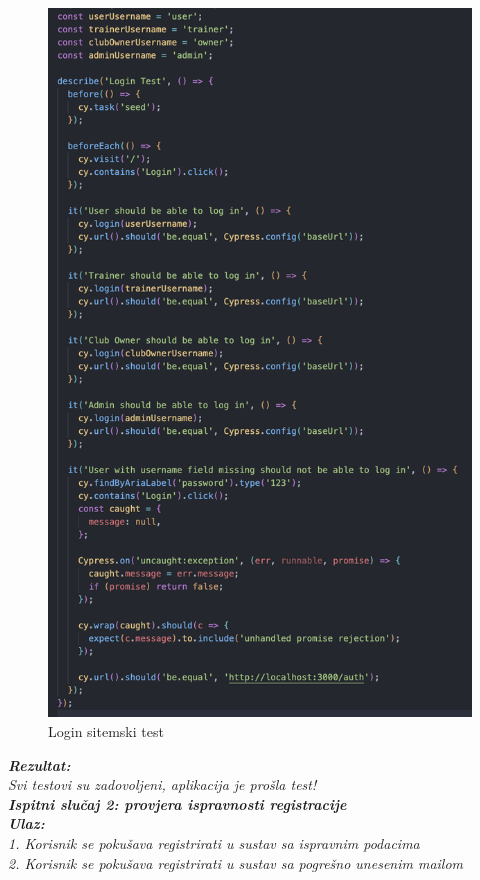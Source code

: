 \begin{figure}[H]
			\includegraphics[scale=0.5]{slike/loginTest.PNG} %
			\centering
			\caption{Login sitemski test}
			\label{fig:rez1}
			\end{figure}

			 \textbf{\textit{Rezultat:}}\\
			 \textit{Svi testovi su zadovoljeni, aplikacija je prošla test!}\\

			 \textbf{\textit{Ispitni slučaj 2: provjera ispravnosti registracije}}\\
			 \textbf{\textit{Ulaz:}}\\
			  \textit{1. Korisnik se pokušava registrirati u sustav sa ispravnim podacima}\\
			  \textit{2. Korisnik se pokušava registrirati u sustav sa pogrešno unesenim mailom}\\
 
